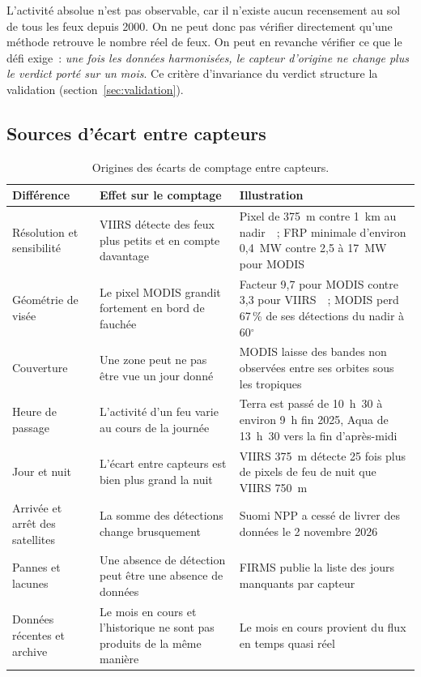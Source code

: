 \documentclass[11pt,a4paper]{article}
\begin{document}
L'activité absolue n'est pas observable, car il n'existe aucun recensement au sol de tous les feux depuis 2000. On ne peut donc pas vérifier directement qu'une méthode retrouve le nombre réel de feux. On peut en revanche vérifier ce que le défi exige~: \emph{une fois les données harmonisées, le capteur d'origine ne change plus le verdict porté sur un mois}. Ce critère d'invariance du verdict structure la validation (section~\ref{sec:validation}).

\subsection{Sources d'écart entre capteurs}

\begin{table}[h]
\centering\small
\caption{Origines des écarts de comptage entre capteurs.}
\label{tab:ecarts}
\begin{tabularx}{\linewidth}{>{\raggedright\arraybackslash}p{3.1cm} Y Y}
\toprule
Différence & Effet sur le comptage & Illustration \\
\midrule
Résolution et sensibilité & VIIRS détecte des feux plus petits et en compte davantage & Pixel de 375~m contre 1~km au nadir~\cite{schroeder2014}~; FRP minimale d'environ 0,4~MW contre 2,5 à 17~MW pour MODIS~\cite{fu2020} \\
Géométrie de visée & Le pixel MODIS grandit fortement en bord de fauchée & Facteur 9,7 pour MODIS contre 3,3 pour VIIRS~\cite{giglio2025}~; MODIS perd 67\,\% de ses détections du nadir à 60$^\circ$~\cite{li2018} \\
Couverture & Une zone peut ne pas être vue un jour donné & MODIS laisse des bandes non observées entre ses orbites sous les tropiques~\cite{zheng2026} \\
Heure de passage & L'activité d'un feu varie au cours de la journée & Terra est passé de 10~h~30 à environ 9~h fin 2025, Aqua de 13~h~30 vers la fin d'après-midi~\cite{nsidc} \\
Jour et nuit & L'écart entre capteurs est bien plus grand la nuit & VIIRS 375~m détecte 25 fois plus de pixels de feu de nuit que VIIRS 750~m~\cite{schroeder2014} \\
Arrivée et arrêt des satellites & La somme des détections change brusquement & Suomi NPP a cessé de livrer des données le 2 novembre 2026~\cite{earthdata2026} \\
Pannes et lacunes & Une absence de détection peut être une absence de données & FIRMS publie la liste des jours manquants par capteur~\cite{firmsmissing} \\
Données récentes et archive & Le mois en cours et l'historique ne sont pas produits de la même manière & Le mois en cours provient du flux en temps quasi réel \\
\bottomrule
\end{tabularx}
\end{table}
\end{document}

